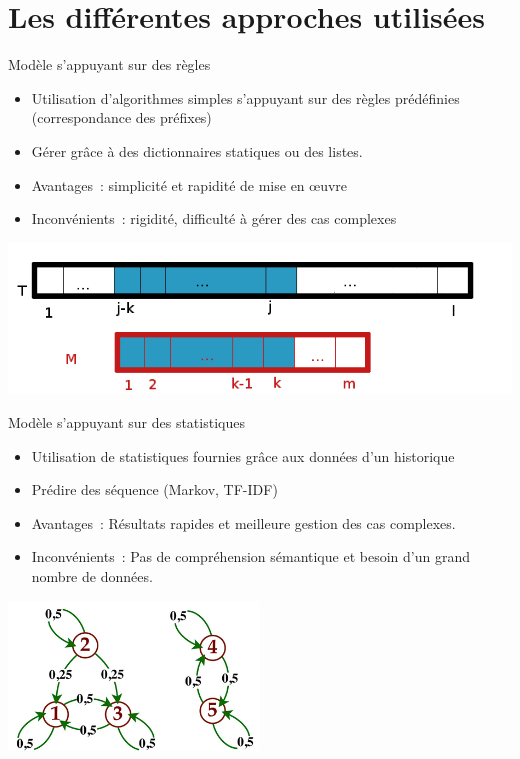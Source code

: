 \section{Les différentes approches utilisées}
\begin{frame}{Modèle s'appuyant sur des règles}
	\begin{itemize}
		\item Utilisation d'algorithmes simples s'appuyant sur des règles prédéfinies (correspondance des préfixes) 
		\item Gérer grâce à des dictionnaires statiques ou des listes.
		\item Avantages~: simplicité et rapidité de mise en œuvre
		\item Inconvénients~: rigidité, difficulté à gérer des cas complexes
	\end{itemize}
        \begin{center}
			\includegraphics[width=\textwidth]{images/regles.png}
	\end{center}
\end{frame}

\begin{frame}{Modèle s'appuyant sur des statistiques}
	\begin{itemize}
		\item Utilisation de statistiques fournies grâce aux données d'un historique
            \item Prédire des séquence (Markov, TF-IDF)
		\item Avantages~: Résultats rapides et meilleure gestion des cas complexes.
		\item Inconvénients~: Pas de compréhension sémantique et besoin d'un grand nombre de données.
	\end{itemize}
        \begin{center}
			\includegraphics[width=0.5\textwidth]{images/statistiques.png}
	\end{center}
\end{frame}



